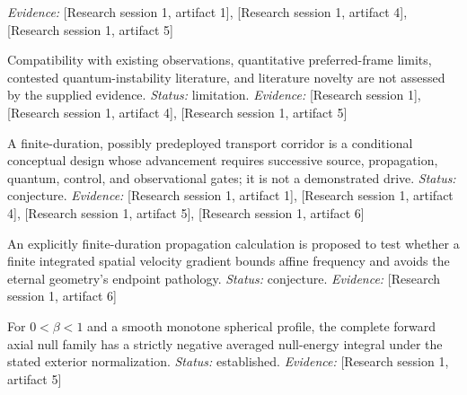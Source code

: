 \documentclass[11pt]{article}
\begin{document}
\begin{sloppypar}
\begin{description}
\textit{Evidence: }[Research session 1, artifact 1], [Research session 1, artifact 4], [Research session 1, artifact 5]
\item[C17] Compatibility with existing observations, quantitative preferred-frame limits, contested quantum-instability literature, and literature novelty are not assessed by the supplied evidence. \textit{Status: }limitation.
\textit{Evidence: }[Research session 1], [Research session 1, artifact 4], [Research session 1, artifact 5]
\item[C18] A finite-duration, possibly predeployed transport corridor is a conditional conceptual design whose advancement requires successive source, propagation, quantum, control, and observational gates; it is not a demonstrated drive. \textit{Status: }conjecture.
\textit{Evidence: }[Research session 1, artifact 1], [Research session 1, artifact 4], [Research session 1, artifact 5], [Research session 1, artifact 6]
\item[C19] An explicitly finite-duration propagation calculation is proposed to test whether a finite integrated spatial velocity gradient bounds affine frequency and avoids the eternal geometry's endpoint pathology. \textit{Status: }conjecture.
\textit{Evidence: }[Research session 1, artifact 6]
\item[C10] For $0<\beta<1$ and a smooth monotone spherical profile, the complete forward axial null family has a strictly negative averaged null-energy integral under the stated exterior normalization. \textit{Status: }established.
\textit{Evidence: }[Research session 1, artifact 5]
\end{description}
\end{sloppypar}
\end{document}
